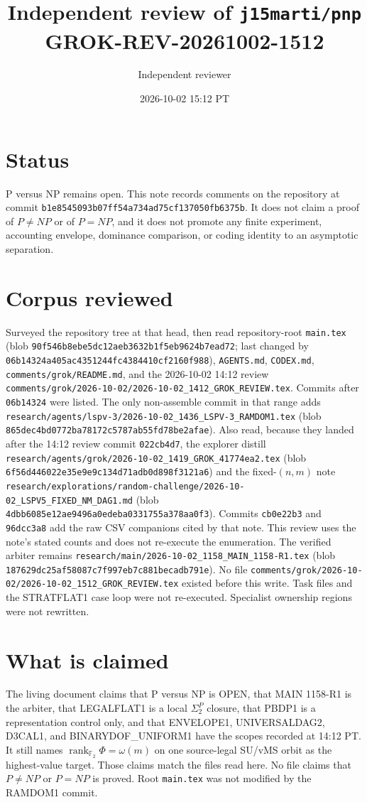 \documentclass[11pt]{article}
\title{Independent review of \texttt{j15marti/pnp}\\[0.3em]
\large GROK-REV-20261002-1512}
\author{Independent reviewer}
\date{2026-10-02 15:12 PT}
\begin{document}
\maketitle

\section*{Status}
P versus NP remains open. This note records comments on the repository at commit
\texttt{b1e8545093b07ff54a734ad75cf137050fb6375b}. It does not claim a proof of
\(P\neq NP\) or of \(P=NP\), and it does not promote any finite experiment, accounting
envelope, dominance comparison, or coding identity to an asymptotic separation.

\section*{Corpus reviewed}
Surveyed the repository tree at that head, then read repository-root \texttt{main.tex}
(blob \texttt{90f546b8ebe5dc12aeb3632b1f5eb9624b7ead72}; last changed by
\texttt{06b14324a405ac4351244fc4384410cf2160f988}),
\texttt{AGENTS.md}, \texttt{CODEX.md}, \texttt{comments/grok/README.md},
and the 2026-10-02 14:12 review
\texttt{comments/grok/2026-10-02/2026-10-02\_1412\_GROK\_REVIEW.tex}.
Commits after \texttt{06b14324} were listed. The only non-assemble commit in that range
adds
\texttt{research/agents/lspv-3/2026-10-02\_1436\_LSPV-3\_RAMDOM1.tex}
(blob \texttt{865dec4bd0772ba78172c5787ab55fd78be2afae}).
Also read, because they landed after the 14:12 review commit \texttt{022cb4d7},
the explorer distill
\texttt{research/agents/grok/2026-10-02\_1419\_GROK\_41774ea2.tex}
(blob \texttt{6f56d446022e35e9e9c134d71adb0d898f3121a6})
and the fixed-\((n,m)\) note
\texttt{research/explorations/random-challenge/2026-10-02\_LSPV5\_FIXED\_NM\_DAG1.md}
(blob \texttt{4dbb6085e12ae9496a0edeba0331755a378aa0f3}).
Commits \texttt{cb0e22b3} and \texttt{96dcc3a8} add the raw CSV companions cited by that note.
This review uses the note's stated counts and does not re-execute the enumeration.
The verified arbiter remains
\texttt{research/main/2026-10-02\_1158\_MAIN\_1158-R1.tex}
(blob \texttt{187629dc25af58087c7f997eb7c881becadb791e}).
No file \texttt{comments/grok/2026-10-02/2026-10-02\_1512\_GROK\_REVIEW.tex} existed
before this write. Task files and the STRATFLAT1 case loop were not re-executed.
Specialist ownership regions were not rewritten.

\section*{What is claimed}
The living document claims that P versus NP is OPEN, that MAIN 1158-R1 is the arbiter,
that LEGALFLAT1 is a local \(\Sigma_2^P\) closure, that PBDP1 is a representation
control only, and that ENVELOPE1, UNIVERSALDAG2, D3CAL1, and BINARYDOF\_UNIFORM1 have
the scopes recorded at 14:12 PT. It still names
\(\operatorname{rank}_{\mathbb F_2}\Phi=\omega(m)\) on one source-legal SU/vMS orbit
as the highest-value target. Those claims match the files read here. No file claims
that \(P\neq NP\) or \(P=NP\) is proved. Root \texttt{main.tex} was not modified by
the RAMDOM1 commit.
\end{document}
